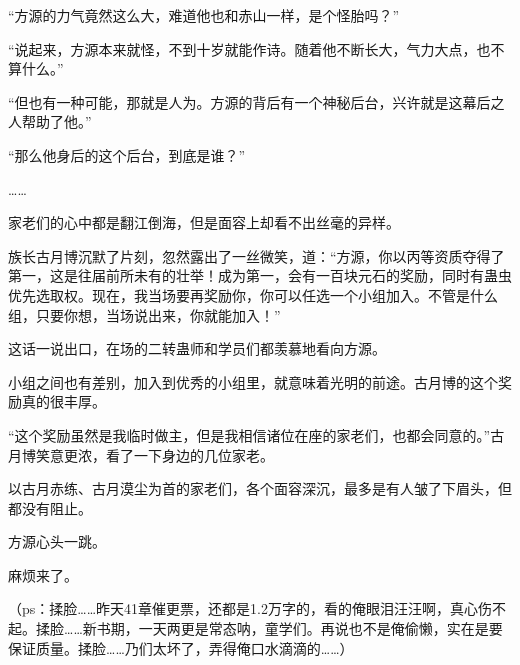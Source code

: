 \begin{this_body}
“方源的力气竟然这么大，难道他也和赤山一样，是个怪胎吗？”

“说起来，方源本来就怪，不到十岁就能作诗。随着他不断长大，气力大点，也不算什么。”

“但也有一种可能，那就是人为。方源的背后有一个神秘后台，兴许就是这幕后之人帮助了他。”

“那么他身后的这个后台，到底是谁？”

……

家老们的心中都是翻江倒海，但是面容上却看不出丝毫的异样。

族长古月博沉默了片刻，忽然露出了一丝微笑，道：“方源，你以丙等资质夺得了第一，这是往届前所未有的壮举！成为第一，会有一百块元石的奖励，同时有蛊虫优先选取权。现在，我当场要再奖励你，你可以任选一个小组加入。不管是什么组，只要你想，当场说出来，你就能加入！”

这话一说出口，在场的二转蛊师和学员们都羡慕地看向方源。

小组之间也有差别，加入到优秀的小组里，就意味着光明的前途。古月博的这个奖励真的很丰厚。

“这个奖励虽然是我临时做主，但是我相信诸位在座的家老们，也都会同意的。”古月博笑意更浓，看了一下身边的几位家老。

以古月赤练、古月漠尘为首的家老们，各个面容深沉，最多是有人皱了下眉头，但都没有阻止。

方源心头一跳。

麻烦来了。

（ps：揉脸……昨天41章催更票，还都是1.2万字的，看的俺眼泪汪汪啊，真心伤不起。揉脸……新书期，一天两更是常态呐，童学们。再说也不是俺偷懒，实在是要保证质量。揉脸……乃们太坏了，弄得俺口水滴滴的……）

\end{this_body}

